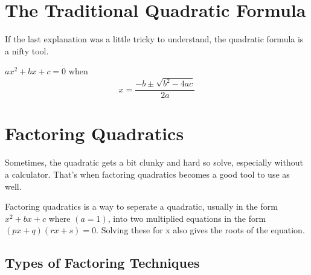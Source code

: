 \section{The Traditional Quadratic Formula}

If the last explanation was a little tricky to understand, the quadratic formula is a nifty tool.

\begin{mdframed}[style=important, frametitle={The Quadratic Formula}]

$ax^2 + bx + c = 0$ when
\begin{equation*}
  x = \frac{-b \pm \sqrt{b^2 - 4ac}}{2a}
\end{equation*}

\end{mdframed}


\section{Factoring Quadratics}


Sometimes, the quadratic gets a bit clunky and hard so solve, especially without a calculator. That's when factoring quadratics becomes a good tool to use as well.

Factoring quadratics is a way to seperate a quadratic, usually in the form $x^2 + bx + c$ where $(a=1)$, into two multiplied equations in the form $(px + q)(rx + s) = 0$. Solving these for x also gives the roots of the equation. 

\subsection*{Types of Factoring Techniques}

